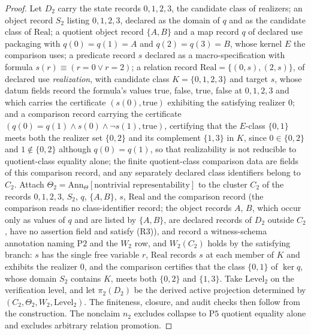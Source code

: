 \documentclass[11pt]{article}
\theoremstyle{definition}
\newcommand{\Ptwo}{\ensuremath{\mathrm{P2}}}
\newcommand{\Pfive}{\ensuremath{\mathrm{P5}}}
\begin{document}
\begin{proof}
Let \(D_2\) carry the state records \(0,1,2,3\), the candidate class of
realizers; an object record \(S_2\) listing \(0,1,2,3\), declared as the domain
of \(q\) and as the candidate class of \(\mathrm{Real}\); a quotient object record \(\{A,B\}\) and a map record \(q\) of
declared use packaging with \(q(0)=q(1)=A\) and \(q(2)=q(3)=B\), whose kernel
\(E\) the comparison uses; a predicate record \(s\) declared as a
macro-specification with formula \(s(r)\equiv(r=0\lor r=2)\); a relation record
\(\mathrm{Real}=\{(0,s),(2,s)\}\), of declared use \emph{realization}, with
candidate class \(K=\{0,1,2,3\}\) and target \(s\),
whose datum fields record the formula's values true, false, true, false at \(0,1,2,3\) and which carries
the certificate \((s(0),\mathrm{true})\) exhibiting the satisfying realizer
\(0\); and a comparison record carrying the certificate
\((q(0)=q(1)\wedge s(0)\wedge\neg s(1),\mathrm{true})\), certifying that the
\(E\)-class \(\{0,1\}\) meets both the realizer set \(\{0,2\}\) and its
complement \(\{1,3\}\) in \(K\), since \(0\in\{0,2\}\) and \(1\notin\{0,2\}\)
although \(q(0)=q(1)\), so that
realizability is not reducible to quotient-class equality alone; the finite quotient-class comparison data are
fields of this comparison record, and any separately declared class
identifiers belong to \(C_2\). Attach
\(\Theta_2 = \mathrm{Ann}_\Theta[\text{nontrivial representability}]\)
to the cluster \(C_2\) of the records \(0,1,2,3\), \(S_2\), \(q\), \(\{A,B\}\), \(s\), \(\mathrm{Real}\) and the comparison record (the comparison reads no class-identifier record; the object records \(A\), \(B\), which occur only as values of \(q\) and are listed by \(\{A,B\}\), are declared records of \(D_2\) outside \(C_2\), have no assertion field and satisfy (R3)), and record a witness-schema annotation naming \Ptwo{} and the \(W_2\) row,
and \(W_2(C_2)\) holds by the satisfying branch: \(s\) has the single free
variable \(r\), \(\mathrm{Real}\) records \(s\) at each member of \(K\) and
exhibits the realizer \(0\), and the comparison certifies that the class
\(\{0,1\}\) of \(\ker q\), whose domain \(S_2\) contains \(K\), meets both
\(\{0,2\}\) and \(\{1,3\}\). Take
\(\mathrm{Level}_2\) on the verification level, and let \(\pi_2(D_2)\)
be the derived active projection determined by
\((C_2,\Theta_2,W_2,\mathrm{Level}_2)\). The finiteness, closure, and
audit checks then follow from the construction. The
nonclaim \(n_2\) excludes collapse to \Pfive{} quotient equality alone
and excludes arbitrary relation promotion.
\end{proof}
\end{document}
